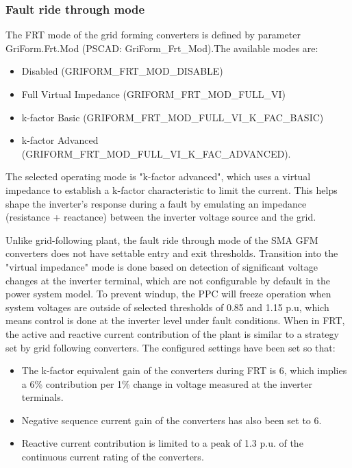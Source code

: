 \documentclass{../grid-link-report}
\begin{document}
	\subsubsection{Fault ride through mode}
	
	The \ac{FRT} mode of the grid forming converters is defined by parameter GriForm.Frt.Mod (PSCAD: GriForm_Frt_Mod).The available modes are:
	
		\begin{itemize}
		\item Disabled (GRIFORM_FRT_MOD_DISABLE) 
		\item Full Virtual Impedance (GRIFORM_FRT_MOD_FULL_VI)
		\item k-factor Basic (GRIFORM_FRT_MOD_FULL_VI_K_FAC_BASIC)
		\item k-factor Advanced (GRIFORM_FRT_MOD_FULL_VI_K_FAC_ADVANCED).		
	\end{itemize}
	
	The selected operating mode is "k-factor advanced", which uses a virtual impedance to establish a k-factor characteristic to limit the current.  This helps shape the inverter's response during a fault by emulating an impedance (resistance + reactance) between the inverter voltage source and the grid.
	
	Unlike grid-following plant, the fault ride through mode of the SMA GFM converters does not have settable entry and exit thresholds. Transition into the "virtual impedance" mode is done based on detection of significant voltage changes at the inverter terminal, which are not configurable by default in the power system model. To prevent windup, the PPC will freeze operation when system voltages are outside of selected thresholds of 0.85 and 1.15 p.u, which means control is done at the inverter level under fault conditions. When in FRT, the active and reactive current contribution of the plant is similar to a strategy set by grid following converters. The configured settings have been set so that:
	
	\begin{itemize}
		\item The k-factor equivalent gain of the converters during FRT is 6, which implies a 6\% contribution per 1\% change in voltage measured at the inverter terminals.
		\item Negative sequence current gain of the converters has also been set to 6.
		\item Reactive current contribution is limited to a peak of 1.3 p.u. of the continuous current rating of the converters.
	\end{itemize} 
	
\end{document}
